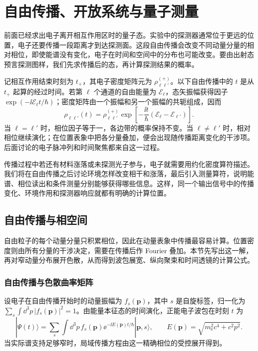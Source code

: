 \chapter{自由传播、开放系统与量子测量}\label{chap:prop-measure}

前面已经求出电子离开相互作用区时的量子态。实验中的探测器通常位于更远的位置，电子还要传播一段距离才到达探测面。这段自由传播会改变不同动量分量的相对相位，即使能谱没有变化，电子在时间和空间中的分布也可能改变。要由出射态预言探测图样，我们先求传播后的态，再计算探测结果的概率。

记相互作用结束时刻为 $t_+$，其电子密度矩阵元为 $\rho_{\ell\ell'}^{(+)}$。以下自由传播中的 $t$ 是从 $t_+$ 起算的经过时间。若第 $\ell$ 个通道的自由能量为 $\mathcal E_\ell$，态矢振幅获得因子 $\exp(-\ii\mathcal E_\ell t/\hbar)$；密度矩阵由一个振幅和另一个振幅的共轭组成，因而
\begin{equation}
\boxed{
\rho_{\ell\ell'}(t)
=\rho_{\ell\ell'}^{(+)}
\exp\!\left[-\frac{\ii t}{\hbar}
(\mathcal E_\ell-\mathcal E_{\ell'})\right].}
\label{eq:sideband_coherence_free_propagation_master}
\end{equation}
当 $\ell=\ell'$ 时，相位因子等于一，各边带的概率保持不变。当 $\ell\ne\ell'$ 时，相对相位继续演化；在位置表象中把各分量叠加，便会出现随传播距离变化的干涉项。后面讨论的电子脉冲列和时间聚焦都来自这一过程。

传播过程中若还有材料涨落或未探测光子参与，电子就需要用约化密度算符描述。我们将在自由传播之后讨论环境怎样改变相干和涨落，最后引入测量算符，说明能谱、相位读出和条件测量分别能够获得哪些信息。这样，同一个输出信号中的传播变化、环境作用和探测器响应就都有明确的计算位置。

\section{自由传播与相空间}

自由粒子的每个动量分量只积累相位，因此在动量表象中传播最容易计算。位置密度则由所有分量的干涉决定，需要在传播后作 Fourier 叠加。本节先写出这一解，再对窄动量分布展开色散，从而得到波包展宽、纵向聚束和时间透镜的计算公式。

\subsection{自由传播与色散曲率矩阵}

设电子在自由传播开始时的动量振幅为 $f_s(\mathbf p)$，其中 $s$ 是自旋标签，归一化为 $\sum_s\int\dd^3p\,|f_s(\mathbf p)|^2=1$。由能量本征态的时间演化，正能电子波包在时刻 $t$ 为
\begin{equation*}
|\Psi(t)\rangle
=\sum_s\int\dd^3 p\,f_s(\mathbf p)
\ee^{-\ii E(\mathbf p)t/\hbar}|\mathbf p,s\rangle,
\qquad
E(\mathbf p)=\sqrt{m_{\mathrm e}^2c^4+c^2p^2}.
\end{equation*}
当实际谱支持足够窄时，局域传播方程由这一精确相位的受控展开得到。

